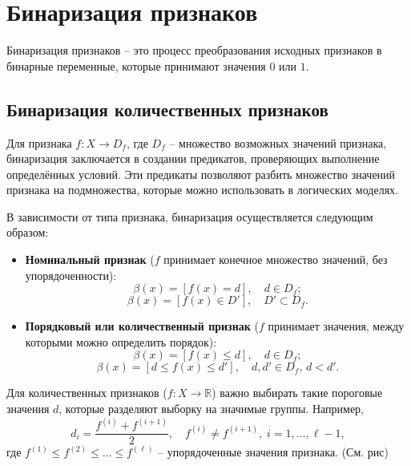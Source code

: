 \section{Бинаризация признаков}

Бинаризация признаков – это процесс преобразования исходных признаков в бинарные переменные, которые принимают значения \(0\) или \(1\). 

\subsection{Бинаризация количественных признаков}

Для признака \( f: X \to D_f \), где \( D_f \) – множество возможных значений признака, бинаризация заключается в создании предикатов, проверяющих выполнение определённых условий. Эти предикаты позволяют разбить множество значений признака на подмножества, которые можно использовать в логических моделях.

В зависимости от типа признака, бинаризация осуществляется следующим образом:
\begin{itemize}
    \item \textbf{Номинальный признак} (\(f\) принимает конечное множество значений, без упорядоченности):
          \[
              \beta(x) = [f(x) = d], \quad d \in D_f;
          \]
          \[
              \beta(x) = [f(x) \in D'], \quad D' \subset D_f.
          \]
    \item \textbf{Порядковый или количественный признак} (\(f\) принимает значения, между которыми можно определить порядок):
          \[
              \beta(x) = [f(x) \leq d], \quad d \in D_f;
          \]
          \[
              \beta(x) = [d \leq f(x) \leq d'], \quad d, d' \in D_f, \, d < d'.
          \]
\end{itemize}

Для количественных признаков (\(f: X \to \mathbb{R}\)) важно выбирать такие пороговые значения \(d\), которые разделяют выборку на значимые группы. Например, 
\[
    d_i = \frac{f^{(i)} + f^{(i+1)}}{2}, \quad f^{(i)} \neq f^{(i+1)}, \; i = 1, \dots, \ell - 1,
\]
где \(f^{(1)} \leq f^{(2)} \leq \dots \leq f^{(\ell)}\) – упорядоченные значения признака. (См. рис)

